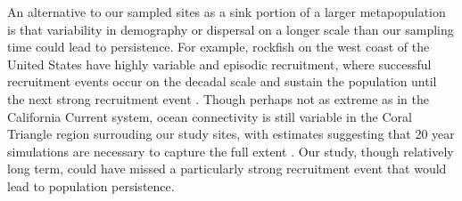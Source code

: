 \documentclass[12pt, oneside]{article}   	%
\begin{document}
An alternative to our sampled sites as a sink portion of a larger metapopulation is that variability in demography or dispersal on a longer scale than our sampling time could lead to persistence. For example, rockfish on the west coast of the United States have highly variable and episodic recruitment, where successful recruitment events occur on the decadal scale and sustain the population until the next strong recruitment event \citep[e.g.,][]{tolimieri2005roles}. Though perhaps not as extreme as in the California Current system, ocean connectivity is still variable in the Coral Triangle region surrouding our study sites, with estimates suggesting that 20 year simulations are necessary to capture the full extent \citep{thompson2018variability}. Our study, though relatively long term, could have missed a particularly strong recruitment event that would lead to population persistence. 

\end{document}
